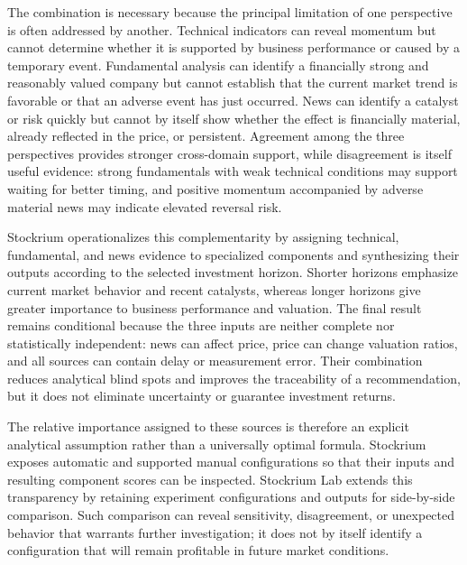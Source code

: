 The combination is necessary because the principal limitation of one perspective is often addressed by another. Technical indicators can reveal momentum but cannot determine whether it is supported by business performance or caused by a temporary event. Fundamental analysis can identify a financially strong and reasonably valued company but cannot establish that the current market trend is favorable or that an adverse event has just occurred. News can identify a catalyst or risk quickly but cannot by itself show whether the effect is financially material, already reflected in the price, or persistent. Agreement among the three perspectives provides stronger cross-domain support, while disagreement is itself useful evidence: strong fundamentals with weak technical conditions may support waiting for better timing, and positive momentum accompanied by adverse material news may indicate elevated reversal risk.

Stockrium operationalizes this complementarity by assigning technical, fundamental, and news evidence to specialized components and synthesizing their outputs according to the selected investment horizon. Shorter horizons emphasize current market behavior and recent catalysts, whereas longer horizons give greater importance to business performance and valuation. The final result remains conditional because the three inputs are neither complete nor statistically independent: news can affect price, price can change valuation ratios, and all sources can contain delay or measurement error. Their combination reduces analytical blind spots and improves the traceability of a recommendation, but it does not eliminate uncertainty or guarantee investment returns.

The relative importance assigned to these sources is therefore an explicit analytical assumption rather than a universally optimal formula. Stockrium exposes automatic and supported manual configurations so that their inputs and resulting component scores can be inspected. Stockrium Lab extends this transparency by retaining experiment configurations and outputs for side-by-side comparison. Such comparison can reveal sensitivity, disagreement, or unexpected behavior that warrants further investigation; it does not by itself identify a configuration that will remain profitable in future market conditions.
